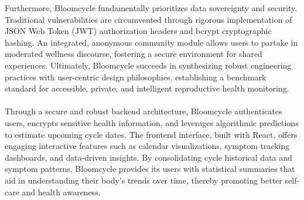 Furthermore, Bloomcycle fundamentally prioritizes data sovereignty and security. Traditional vulnerabilities are circumvented through rigorous implementation of JSON Web Token (JWT) authorization headers and bcrypt cryptographic hashing. An integrated, anonymous community module allows users to partake in moderated wellness discourse, fostering a secure environment for shared experiences. Ultimately, Bloomcycle succeeds in synthesizing robust engineering practices with user-centric design philosophies, establishing a benchmark standard for accessible, private, and intelligent reproductive health monitoring.
\\\\
Through a secure and robust backend architecture, Bloomcycle authenticates users, encrypts sensitive health information, and leverages algorithmic predictions to estimate upcoming cycle dates. The frontend interface, built with React, offers engaging interactive features such as calendar visualizations, symptom tracking dashboards, and data-driven insights. By consolidating cycle historical data and symptom patterns, Bloomcycle provides its users with statistical summaries that aid in understanding their body's trends over time, thereby promoting better self-care and health awareness.
